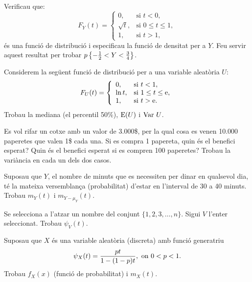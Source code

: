 \begin{prob}
{Verificau que:
$$F_Y(t)=
\left\{\begin{array}{ll}
0, & \text{si $t<0$},\\
\sqrt{t}, & \text{si $0\leq t\leq 1$},\\ 1, &
\text{si $t>1$},
\end{array}\right.
$$
\'es una funci\'o de distribuci\'o i especificau la 
funci\'o de densitat
per a $Y$. Feu servir aquest resultat per trobar $p\left\{-{1\over 2}<Y<{3\over
4}\right\}$.} 
\end{prob}

\begin{prob}
{Considerem la seg\"uent funci\'o de distribuci\'o per a una variable
aleat\`oria $U$:
$$F_U(t)=
\left\{\begin{array}{ll}
0, & \mbox{si $t<1$},\\ \ln t, & 
\mbox{si $1\leq t\leq{\rm e}$},\\ 1, & 
\mbox{si $t>{\rm e}$}.
\end{array}\right.$$
Trobau la mediana (el percentil 50\%), ${\rm E} (U)$ i
$\hbox{Var } U$.}
\end{prob}

\begin{prob}
{Es vol rifar un cotxe amb un valor de 3.000\$, per la qual cosa es
venen 10.000 paperetes que valen 1\$ cada una. Si es compra 1 papereta, quin \'es
el benefici esperat? Quin \'es el benefici esperat si es compren 100 paperetes?
Trobau la vari\`ancia en cada un dels dos casos.}
\end{prob}

\begin{prob}
{Suposau que $Y$, el nombre de minuts que es necessiten per dinar en
qualsevol dia, t\'e la mateixa  versemblan\c{c}a (probabilitat) d'estar
en l'interval de 30 a 40 minuts. Trobau $m_Y(t)$ i $m_{Y-\mu_Y}(t)$.}
\end{prob}

\begin{prob}
{Se selecciona a l'atzar un nombre del conjunt $\{1,2,3,\ldots,n\}$.
Sigui $V$ l'enter seleccionat. Trobau $\psi_V(t)$.}
\end{prob}

\begin{prob}
{Suposau que $X$ \'es una variable aleat\`oria (discreta) amb funci\'o
generatriu
$$\psi_X (t)={pt\over 1-(1-p) t},\hbox{ on } 0<p<1.$$Trobau $f_X(x)$ (funci\'o
de probabilitat) i $m_X(t)$.}
\end{prob}

